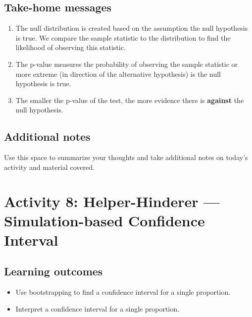 \documentclass[
]{report}
\begin{document}

\subsection{Take-home messages}\label{take-home-messages-6}

\begin{enumerate}
\def\labelenumi{\arabic{enumi}.}
\item
  The null distribution is created based on the assumption the null hypothesis is true. We compare the sample statistic to the distribution to find the likelihood of observing this statistic.
\item
  The p-value measures the probability of observing the sample statistic or more extreme (in direction of the alternative hypothesis) is the null hypothesis is true.
\item
  The smaller the p-value of the test, the more evidence there is \textbf{against} the null hypothesis.
\end{enumerate}

\subsection{Additional notes}\label{additional-notes-6}

Use this space to summarize your thoughts and take additional notes on today's activity and material covered.

\newpage

\section{Activity 8: Helper-Hinderer --- Simulation-based Confidence Interval}\label{activity-8-helper-hinderer-simulation-based-confidence-interval}


\subsection{Learning outcomes}\label{learning-outcomes-7}

\begin{itemize}
\item
  Use bootstrapping to find a confidence interval for a single proportion.
\item
  Interpret a confidence interval for a single proportion.
\end{itemize}
\end{document}
